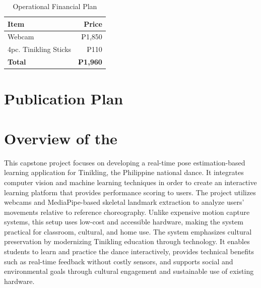 \begin{table}[h]
\centering
\caption{Operational Financial Plan}
\begin{tabular}{|l|r|}
    \hline
    \textbf{Item} & \textbf{Price} \\ \hline
    Webcam  & ₱1,850 \\ \hline
    4pc. Tinikling Sticks  & ₱110 \\ \hline
    \textbf{Total} & \textbf{₱1,960} \\ \hline
\end{tabular}
\end{table}

\ifPhD
\section{Publication Plan}
\graytx{\blindtext}
\fi

\fi

\section{Overview of the \documentType}

This capstone project focuses on developing a real-time pose estimation-based learning application for \gls{Tinikling}, the Philippine national dance. It integrates computer vision and machine learning techniques in order to create an interactive learning platform that provides performance scoring to users. The project utilizes webcams and \gls{MediaPipe}-based skeletal landmark extraction to analyze users’ movements relative to reference choreography. Unlike expensive motion capture systems, this setup uses low-cost and accessible hardware, making the system practical for classroom, cultural, and home use. The system emphasizes cultural preservation by modernizing Tinikling education through technology. It enables students to learn and practice the dance interactively, provides technical benefits such as real-time feedback without costly sensors, and supports social and environmental goals through cultural engagement and sustainable use of existing hardware.
